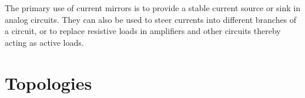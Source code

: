 The primary use of current mirrors is to provide a stable
current source or sink in analog circuits. They can also
be used to steer currents into different branches of a
circuit, or to replace resistive loads in amplifiers and
other circuits thereby acting as active loads.


\section{Topologies}





